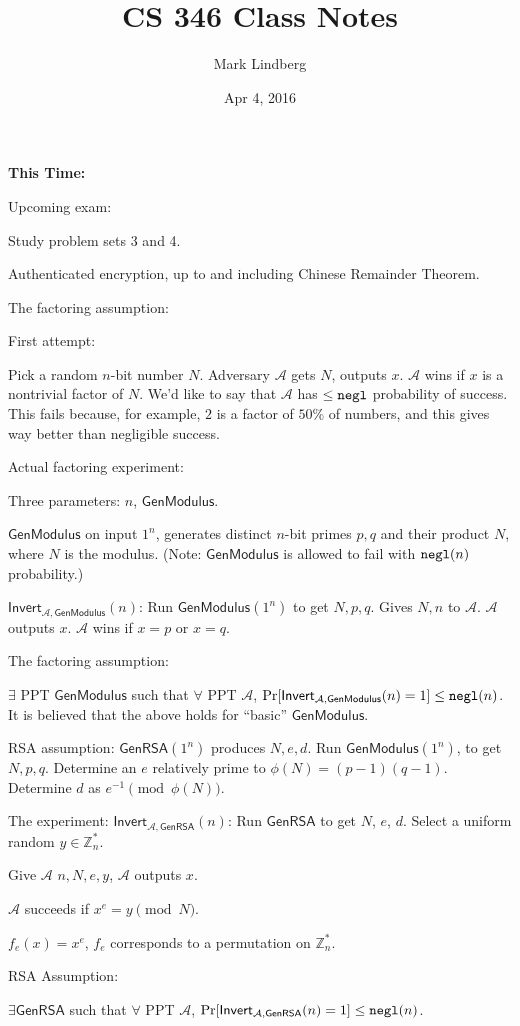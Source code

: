 \documentclass[12pt]{article}
\newcommand{\Z}{\mathbb{Z}}
\newcommand{\AAA}{\mathcal{A}}
\newcommand{\GenRSA}{\mathsf{GenRSA}}
\newcommand{\GenM}{\mathsf{GenModulus}}
\newcommand{\ExptINVTArgs}[2]{\mathsf{Invert}_{#1,#2}}
\newcommand{\ExptRSA}{\ExptINVTArgs{\AAA}{\GenRSA}}
\newcommand{\Fac}{\ExptINVTArgs{\AAA}{\GenM}}
\newcommand{\negl}{{\tt negl}}
\begin{document}
\title{CS 346 Class Notes}
\date{Apr 4, 2016}
\author{Mark Lindberg}
\maketitle
\thispagestyle{fancy}

{\bf This Time:}

Upcoming exam:

Study problem sets 3 and 4.

Authenticated encryption, up to and including Chinese Remainder Theorem.

The factoring assumption:

First attempt:

Pick a random $n$-bit number $N$. Adversary $\AAA$ gets $N$, outputs $x$. $\AAA$ wins if $x$ is a nontrivial factor of $N$. We'd like to say that $\AAA$ has $\leq\negl$ probability of success. This fails because, for example, $2$ is a factor of $50\%$ of numbers, and this gives way better than negligible success.

Actual factoring experiment:

Three parameters: $n$, $\GenM$.

$\GenM$ on input $1^n$, generates distinct $n$-bit primes $p,q$ and their product $N$, where $N$ is the modulus. (Note: $\GenM$ is allowed to fail with $\negl(n)$ probability.)

$\Fac(n)$: Run $\GenM(1^n)$ to get $N,p,q$. Gives $N,n$ to $\AAA$. $\AAA$ outputs $x$. $\AAA$ wins if $x=p$ or $x=q$.

The factoring assumption:

$\exists$ PPT $\GenM$ such that $\forall$ PPT $\AAA$, $\Pr[\Fac(n)=1]\leq\negl(n)$. It is believed that the above holds for ``basic'' $\GenM$.

RSA assumption: $\GenRSA(1^n)$ produces $N,e,d$. Run $\GenM(1^n)$, to get $N,p,q$. Determine an $e$ relatively prime to $\phi(N)=(p-1)(q-1)$. Determine $d$ as $e^{-1}\pmod{\phi(N)}$.

The experiment: $\ExptRSA(n)$: Run $\GenRSA$ to get $N$, $e$, $d$. Select a uniform random $y\in\Z_n^*$.

Give $\AAA$ $n,N,e,y$, $\AAA$ outputs $x$.

$\AAA$ succeeds if $x^e=y\pmod{N}$.

$f_e(x)=x^e$, $f_e$ corresponds to a permutation on $\Z_n^*$.

RSA Assumption:

$\exists \GenRSA$ such that $\forall$ PPT $\AAA$, $\Pr[\ExptRSA(n)=1]\leq\negl(n)$.
\end{document}
